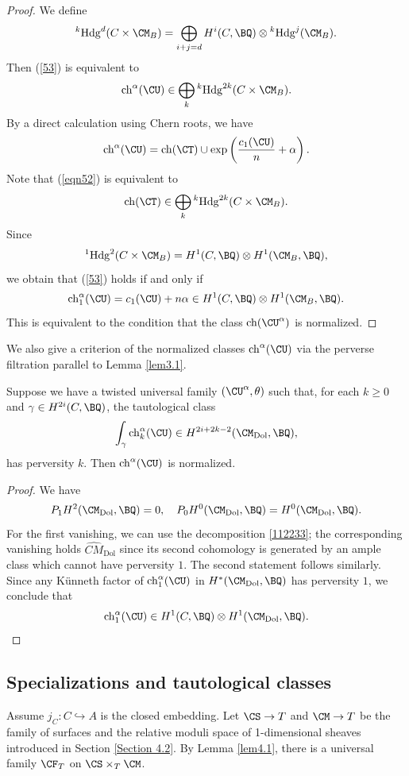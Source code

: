 \begin{proof}
We define
\[
{^k\mathrm{Hdg}^{d}(C\times \CM_B)} = \bigoplus_{i+j=d} H^i(C, \BQ) \otimes {^k\mathrm{Hdg}^{j}(\CM_B)}.
\]
Then (\ref{53}) is equivalent to
\[
\mathrm{ch}^\alpha(\CU) \in \bigoplus_k {^k\mathrm{Hdg}^{2k}(C\times \CM_B)}.
\]
By a direct calculation using Chern roots, we have
\[
\mathrm{ch}^\alpha(\CU) = \mathrm{ch}(\CT) \cup \mathrm{exp}\left(\frac{c_1(\CU)}{n}+ \alpha\right).
\]
Note that (\ref{eqn52}) is equivalent to \[
\mathrm{ch}(\CT) \in \bigoplus_k {^k\mathrm{Hdg}^{2k}(C\times \CM_B)}.
\]
Since
\[
{^1\mathrm{Hdg}^{2}(C\times \CM_B)} = H^1(C, \BQ)\otimes H^1(\CM_B ,\BQ),
\]
we obtain that (\ref{53}) holds if and only if
\[
\mathrm{ch}_1^\alpha(\CU)= c_1(\CU) + n\alpha \in H^1(C, \BQ) \otimes H^1(\CM_B, \BQ).
\]
This is equivalent to the condition that the class $\mathrm{ch}(\CU^\alpha)$ is normalized.
\end{proof}

We also give a criterion of the normalized classes $\mathrm{ch}^\alpha(\CU)$ via the perverse filtration parallel to Lemma \ref{lem3.1}.

\begin{lem}
\notready\label{lem4.7}
Suppose we have a twisted universal family $(\CU^\alpha, \theta)$ such that, for each $k \geq 0$ and $\gamma \in H^{2i}(C, \BQ)$, the tautological class
\begin{equation*}
\int_\gamma \mathrm{ch}^\alpha_k(\CU) \in H^{2i+2k-2}(\CM_\mathrm{Dol}, \BQ),
\end{equation*}
has perversity $k$. Then $\mathrm{ch}^\alpha(\CU)$ is normalized.
\end{lem}

\begin{proof}
We have
\[
 P_1H^2(\CM_{\mathrm{Dol}}, \BQ) = 0, \quad  P_0H^0(\CM_{\mathrm{Dol}}, \BQ)=H^0(\CM_{\mathrm{Dol}}, \BQ).
\]
For the first vanishing, we can use the decomposition \eqref{112233}; the corresponding vanishing holds $\hat{CM}_{\mathrm{Dol}}$ since its second cohomology is generated by an ample class which cannot have perversity $1$.  The second statement follows similarly.
Since any K\"unneth factor of $\mathrm{ch}_1^\alpha(\CU)$ in $H^*(\CM_{\mathrm{Dol}}, \BQ)$ has perversity $1$, we conclude that
\[
\mathrm{ch}_1^\alpha(\CU) \in  H^1(C, \BQ)\otimes H^1(\CM_\mathrm{Dol} ,\BQ). \qedhere
\]
\end{proof}

\subsection{Specializations and tautological classes}
Assume $j_C: C\hookrightarrow A$ is the closed embedding. Let $\CS \to T$ and $\CM \to T$ be the family of surfaces and the relative moduli space of 1-dimensional sheaves introduced in Section \ref{Section 4.2}. By Lemma \ref{lem4.1}, there is a universal family $\CF_T$ on $\CS\times_T \CM$.

